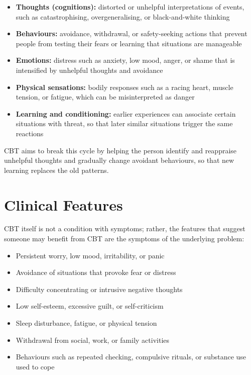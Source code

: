 \begin{itemize}
    \item \textbf{Thoughts (cognitions):} distorted or unhelpful interpretations of events, such as catastrophising, overgeneralising, or black-and-white thinking
    \item \textbf{Behaviours:} avoidance, withdrawal, or safety-seeking actions that prevent people from testing their fears or learning that situations are manageable
    \item \textbf{Emotions:} distress such as anxiety, low mood, anger, or shame that is intensified by unhelpful thoughts and avoidance
    \item \textbf{Physical sensations:} bodily responses such as a racing heart, muscle tension, or fatigue, which can be misinterpreted as danger
    \item \textbf{Learning and conditioning:} earlier experiences can associate certain situations with threat, so that later similar situations trigger the same reactions
\end{itemize}

CBT aims to break this cycle by helping the person identify and reappraise unhelpful thoughts and gradually change avoidant behaviours, so that new learning replaces the old patterns.

\section*{Clinical Features}
CBT itself is not a condition with symptoms; rather, the features that suggest someone may benefit from CBT are the symptoms of the underlying problem:

\begin{itemize}
    \item Persistent worry, low mood, irritability, or panic
    \item Avoidance of situations that provoke fear or distress
    \item Difficulty concentrating or intrusive negative thoughts
    \item Low self-esteem, excessive guilt, or self-criticism
    \item Sleep disturbance, fatigue, or physical tension
    \item Withdrawal from social, work, or family activities
    \item Behaviours such as repeated checking, compulsive rituals, or substance use used to cope
\end{itemize}

